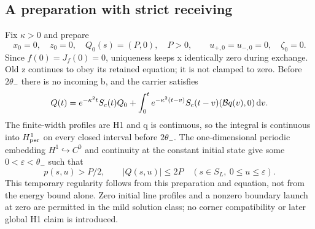 \subsection{A preparation with strict receiving}
Fix $\kappa>0$ and prepare
\begin{equation}\label{eq:preload}
x_0=0,\quad z_0=0,\quad Q_0(s)=(P,0),\quad P>0,\qquad
u_{+,0}=u_{-,0}=0,\quad\zeta_0=0.
\end{equation}
Since $f(0)=J_f(0)=0$, uniqueness keeps x identically zero during exchange. Old z continues to obey its retained equation; it is not clamped to zero. Before $2\theta_-$ there is no incoming b, and the carrier satisfies
\begin{equation}\label{eq:earlycarrier}
Q(t)=e^{-\kappa^2t}S_c(t)Q_0+
\int_0^t e^{-\kappa^2(t-v)}S_c(t-v)(\mathcal B q(v),0)\,\mathrm d v.
\end{equation}
The finite-width profiles are H1 and q is continuous, so the integral is continuous into $H^1_{\rm per}$ on every closed interval before $2\theta_-$. The one-dimensional periodic embedding $H^1\hookrightarrow C^0$ and continuity at the constant initial state give some $0<\varepsilon<\theta_-$ such that
\begin{equation}\label{eq:earlypositive}
p(s,u)>P/2,\qquad |Q(s,u)|\le2P
\quad(s\in S_L,\ 0\le u\le\varepsilon).
\end{equation}
This temporary regularity follows from this preparation and equation, not from the energy bound alone. Zero initial line profiles and a nonzero boundary launch at zero are permitted in the mild solution class; no corner compatibility or later global H1 claim is introduced.

